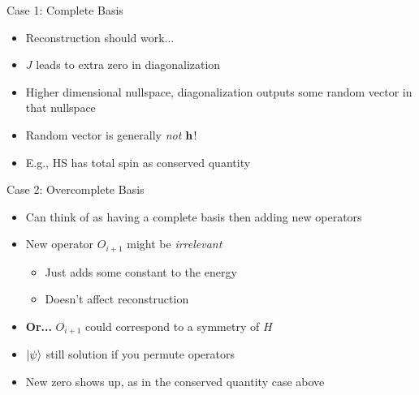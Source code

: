 \documentclass{beamer}
\begin{document}
\begin{frame}{Case 1: Complete Basis}
\begin{itemize}
\item<+-> Reconstruction should work... 
\item<+-> $ J $ leads to extra zero in diagonalization 
\item<+-> Higher dimensional nullspace, diagonalization outputs some 
random vector in that nullspace
\item<+-> Random vector is generally \textit{not} $ \vb{h} $!
\item<+-> E.g., HS has total spin as conserved quantity 
\end{itemize}
\end{frame}

\begin{frame}{Case 2: Overcomplete Basis}
\begin{itemize}
\item<+-> Can think of as having a complete basis then adding new operators
\item<+-> New operator $ O_{i+1} $ might be \textit{irrelevant}
	\begin{itemize}
	\item<+-> Just adds some constant to the energy
	\item<+-> Doesn't affect reconstruction
	\end{itemize}
\item<+-> \textbf{Or...} $ O_{i+1} $ could correspond to a symmetry of $ H $
\item<+-> $ \ket{\psi} $ still solution if you permute operators 
\item<+-> New zero shows up, as in the conserved quantity case above
\end{itemize}
\end{frame}
\end{document}
